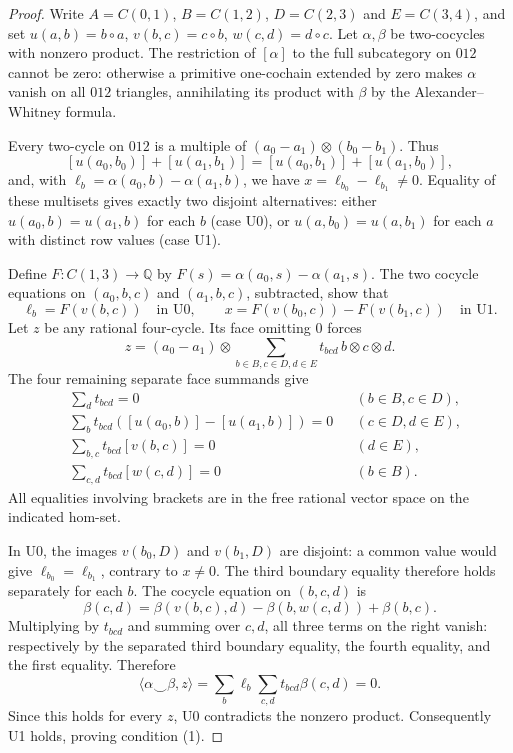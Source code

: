 \begin{proof}
Write $A=C(0,1)$, $B=C(1,2)$, $D=C(2,3)$ and $E=C(3,4)$, and set
$u(a,b)=b\circ a$, $v(b,c)=c\circ b$, $w(c,d)=d\circ c$.
Let $\alpha,\beta$ be two-cocycles with nonzero product. The
restriction of $[\alpha]$ to the full subcategory on $012$ cannot
be zero: otherwise a primitive one-cochain extended by zero makes
$\alpha$ vanish on all $012$ triangles, annihilating its product
with $\beta$ by the Alexander--Whitney formula.

Every two-cycle on $012$ is a multiple of
$(a_0-a_1)\otimes(b_0-b_1)$. Thus
\[
 [u(a_0,b_0)]+[u(a_1,b_1)]
 =[u(a_0,b_1)]+[u(a_1,b_0)],
\]
and, with $\ell_b=\alpha(a_0,b)-\alpha(a_1,b)$, we have
$x=\ell_{b_0}-\ell_{b_1}\ne0$. Equality of these multisets gives
exactly two disjoint alternatives: either $u(a_0,b)=u(a_1,b)$
for each $b$ (case U0), or $u(a,b_0)=u(a,b_1)$ for each $a$
with distinct row values (case U1).

Define $F:C(1,3)\to\mathbb Q$ by
$F(s)=\alpha(a_0,s)-\alpha(a_1,s)$. The two cocycle equations
on $(a_0,b,c)$ and $(a_1,b,c)$, subtracted, show that
\[
 \ell_b=F(v(b,c))\quad\text{in U0},\qquad
 x=F(v(b_0,c))-F(v(b_1,c))\quad\text{in U1}.
\]
Let $z$ be any rational four-cycle. Its face omitting $0$ forces
\[
 z=(a_0-a_1)\otimes
   \sum_{b\in B,c\in D,d\in E}t_{bcd}\,b\otimes c\otimes d.
\]
The four remaining separate face summands give
\begin{align*}
 &\sum_d t_{bcd}=0 &&(b\in B,c\in D),\\
 &\sum_b t_{bcd}([u(a_0,b)]-[u(a_1,b)])=0 &&(c\in D,d\in E),\\
 &\sum_{b,c}t_{bcd}[v(b,c)]=0 &&(d\in E),\\
 &\sum_{c,d}t_{bcd}[w(c,d)]=0 &&(b\in B).
\end{align*}
All equalities involving brackets are in the free rational vector
space on the indicated hom-set.

In U0, the images $v(b_0,D)$ and $v(b_1,D)$ are disjoint: a common
value would give $\ell_{b_0}=\ell_{b_1}$, contrary to $x\ne0$.
The third boundary equality therefore holds separately for each
$b$. The cocycle equation on $(b,c,d)$ is
\[
 \beta(c,d)=\beta(v(b,c),d)-\beta(b,w(c,d))+\beta(b,c).
\]
Multiplying by $t_{bcd}$ and summing over $c,d$, all three terms
on the right vanish: respectively by the separated third boundary
equality, the fourth equality, and the first equality. Therefore
\[
 \langle\alpha\smile\beta,z\rangle
 =\sum_b\ell_b\sum_{c,d}t_{bcd}\beta(c,d)=0.
\]
Since this holds for every $z$, U0 contradicts the nonzero product.
Consequently U1 holds, proving condition (1).


\end{proof}
